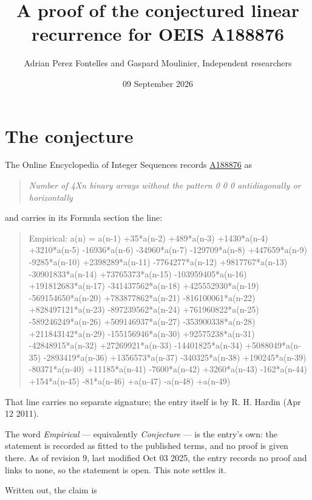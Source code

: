 \documentclass[11pt]{article}
\title{A proof of the conjectured linear recurrence for OEIS A188876}
\author{Adrian Perez Fontelles and Gaspard Moulinier, Independent researchers}
\date{09 September 2026}
\theoremstyle{definition}
\begin{document}
\maketitle
\section{The conjecture}

The Online Encyclopedia of Integer Sequences records \href{https://oeis.org/A188876}{A188876} as

\begin{quote}\itshape Number of 4Xn binary arrays without the pattern 0 0 0 antidiagonally or horizontally\end{quote}

and carries in its Formula section the line:

\begin{quote}\ttfamily Empirical: a(n) = a(n-1) +35*a(n-2) +489*a(n-3) +1430*a(n-4) +3210*a(n-5) -16936*a(n-6) -34960*a(n-7) -129709*a(n-8) +447659*a(n-9) -9285*a(n-10) +2398289*a(n-11) -7764277*a(n-12) +9817767*a(n-13) -30901833*a(n-14) +73765373*a(n-15) -103959405*a(n-16) +191812683*a(n-17) -341437562*a(n-18) +425552930*a(n-19) -569154650*a(n-20) +783877862*a(n-21) -816100061*a(n-22) +828497121*a(n-23) -897239562*a(n-24) +761960822*a(n-25) -589246249*a(n-26) +509146937*a(n-27) -353900338*a(n-28) +211843142*a(n-29) -155156946*a(n-30) +92575238*a(n-31) -42848915*a(n-32) +27269921*a(n-33) -14401825*a(n-34) +5088049*a(n-35) -2893419*a(n-36) +1356573*a(n-37) -340325*a(n-38) +190245*a(n-39) -80371*a(n-40) +11185*a(n-41) -7600*a(n-42) +3260*a(n-43) -162*a(n-44) +154*a(n-45) -81*a(n-46) +a(n-47) -a(n-48) +a(n-49)\end{quote}

That line carries no separate signature; the entry itself is by R. H. Hardin (Apr 12 2011).

The word {\itshape Empirical} --- equivalently {\itshape Conjecture} --- is the entry's own: the statement is recorded as fitted to the published terms, and no proof is given there. As of revision 9, last modified Oct 03 2025, the entry records no proof and links to none, so the statement is open. This note settles it.

Written out, the claim is
\end{document}
